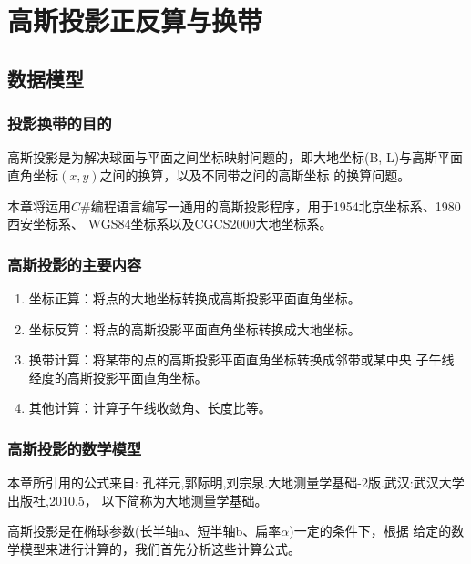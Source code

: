 
\chapter{高斯投影正反算与换带}
\section{数据模型}
\subsection{投影换带的目的}
高斯投影是为解决球面与平面之间坐标映射问题的，即大地坐标(B,
L)与高斯平面直角坐标$(x,y)$之间的换算，以及不同带之间的高斯坐标
的换算问题。

本章将运用$C\#$编程语言编写一通用的高斯投影程序，用于1954北京坐标系、1980西安坐标系、
WGS84坐标系以及CGCS2000大地坐标系。

\subsection{高斯投影的主要内容}
\begin{enumerate}
    \item 坐标正算：将点的大地坐标转换成高斯投影平面直角坐标。
    \item 坐标反算：将点的高斯投影平面直角坐标转换成大地坐标。
    \item 换带计算：将某带的点的高斯投影平面直角坐标转换成邻带或某中央
      子午线经度的高斯投影平面直角坐标。
    \item 其他计算：计算子午线收敛角、长度比等。 
\end{enumerate}

\subsection{高斯投影的数学模型}

本章所引用的公式来自:
孔祥元,郭际明,刘宗泉.大地测量学基础-2版.武汉:武汉大学出版社,2010.5，
以下简称为大地测量学基础。

高斯投影是在椭球参数(长半轴a、短半轴b、扁率$\alpha$)一定的条件下，根据
给定的数学模型来进行计算的，我们首先分析这些计算公式。

